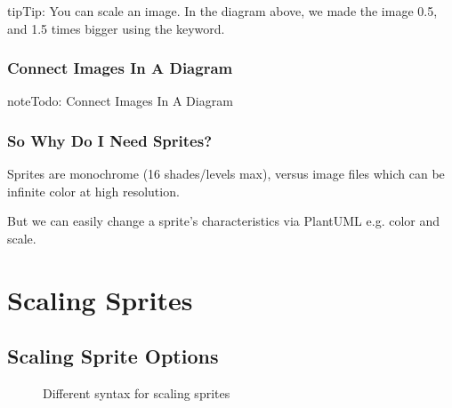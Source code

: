 \documentclass[letterpaper,10pt,english]{sphinxmanual}
\begin{document}
\begin{sphinxadmonition}{tip}{Tip:}
You can scale an image. In the diagram above, we made the image 0.5, and 1.5 times bigger using the  keyword.
\end{sphinxadmonition}


\subsubsection{Connect Images In A Diagram}
\label{\detokenize{PlantUMLSpriteLibraries/plantuml_sprites:connect-images-in-a-diagram}}
\begin{sphinxadmonition}{note}{\label{\detokenize{PlantUMLSpriteLibraries/plantuml_sprites:id1}}Todo:}
Connect Images In A Diagram
\end{sphinxadmonition}


\subsubsection{So Why Do I Need Sprites?}
\label{\detokenize{PlantUMLSpriteLibraries/plantuml_sprites:so-why-do-i-need-sprites}}
Sprites are monochrome (16 shades/levels max), versus image files which can be infinite color at high resolution.

But we can easily change a sprite’s characteristics via PlantUML e.g. color and scale.


\section{Scaling Sprites}
\label{\detokenize{scale/scale:scaling-sprites}}\label{\detokenize{scale/scale:scale-label}}\label{\detokenize{scale/scale::doc}}

\subsection{Scaling Sprite Options}
\label{\detokenize{scale/scale:scaling-sprite-options}}
\begin{figure}[htbp]
\centering
\capstart

\caption{Different syntax for scaling sprites}\label{\detokenize{scale/scale:id1}}\end{figure}
\end{document}
